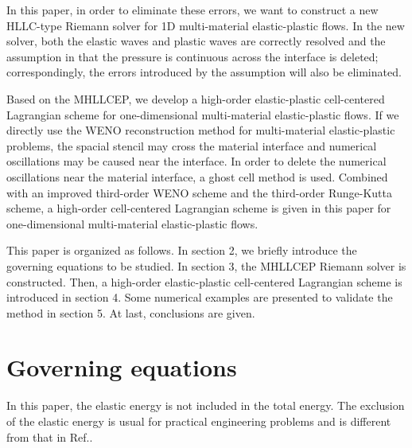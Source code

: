 \documentclass[review]{elsarticle}
\begin{document}
In this paper, in order to eliminate these errors,
we want to construct a new HLLC-type Riemann solver \cite{toro2013riemann, toro1994restoration} for 1D multi-material elastic-plastic flows. In the new solver, both the elastic waves and plastic waves are correctly resolved and the assumption in \cite{cheng2016harten} that the pressure is continuous across the interface is deleted; correspondingly, the errors introduced by the assumption will also be eliminated.

Based on the MHLLCEP, we develop a high-order elastic-plastic cell-centered Lagrangian scheme for one-dimensional multi-material elastic-plastic flows. If we directly use the WENO reconstruction method \cite{jiang1996efficient,huang2012eulerian,dumbser2013high} for multi-material elastic-plastic problems,
the spacial stencil may cross the material interface
 and numerical oscillations may be caused near the interface. In order to delete the numerical oscillations near the material interface, a ghost cell method is used.
   Combined with an improved third-order WENO scheme\cite{liu2018novel} and the third-order Runge-Kutta scheme, a high-order cell-centered Lagrangian scheme is given in this paper for one-dimensional multi-material elastic-plastic flows.

This paper is organized as follows. In section 2, we briefly introduce the governing equations to be studied. In section 3, the MHLLCEP Riemann solver is constructed.  Then, a high-order elastic-plastic cell-centered Lagrangian scheme is introduced in section 4. Some numerical examples are presented to validate the method  in section 5. At last, conclusions are given.
\section{Governing equations}
In this paper, the elastic energy is not included in the total energy. The exclusion of the elastic energy is usual for practical engineering problems \cite{maire2013nominally} and is different from that in Ref.\cite{gavrilyuk2008modelling}.

\end{document}
